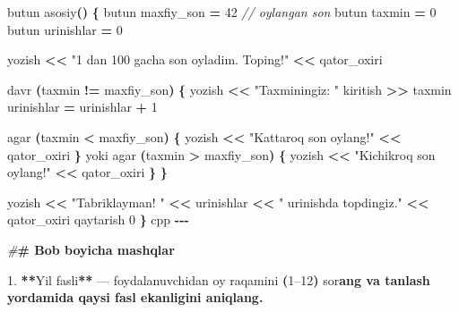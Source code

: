 \documentclass[a4paper,11pt,twoside,openright]{book}
\newenvironment{Shaded}{\begin{snugshade}}{\end{snugshade}}
\newcommand{\CharTok}[1]{\textcolor[rgb]{0.31,0.60,0.02}{#1}}
\newcommand{\CommentTok}[1]{\textcolor[rgb]{0.56,0.35,0.01}{\textit{#1}}}
\newcommand{\DecValTok}[1]{\textcolor[rgb]{0.00,0.00,0.81}{#1}}
\newcommand{\ErrorTok}[1]{\textcolor[rgb]{0.64,0.00,0.00}{\textbf{#1}}}
\newcommand{\FloatTok}[1]{\textcolor[rgb]{0.00,0.00,0.81}{#1}}
\newcommand{\NormalTok}[1]{#1}
\newcommand{\OperatorTok}[1]{\textcolor[rgb]{0.81,0.36,0.00}{\textbf{#1}}}
\newcommand{\PreprocessorTok}[1]{\textcolor[rgb]{0.56,0.35,0.01}{\textit{#1}}}
\newcommand{\StringTok}[1]{\textcolor[rgb]{0.31,0.60,0.02}{#1}}
\begin{document}
\begin{Shaded}
\begin{Highlighting}[]
\NormalTok{butun asosiy}\OperatorTok{()} \OperatorTok{\{}
\NormalTok{    butun maxfiy\_son }\OperatorTok{=} \DecValTok{42}   \CommentTok{// o\textquotesingle{}ylangan son}
\NormalTok{    butun taxmin }\OperatorTok{=} \DecValTok{0}
\NormalTok{    butun urinishlar }\OperatorTok{=} \DecValTok{0}

\NormalTok{    yozish }\OperatorTok{\textless{}\textless{}} \StringTok{"1 dan 100 gacha son o\textquotesingle{}yladim. Toping!"} \OperatorTok{\textless{}\textless{}}\NormalTok{ qator\_oxiri}

\NormalTok{    davr }\OperatorTok{(}\NormalTok{taxmin }\OperatorTok{!=}\NormalTok{ maxfiy\_son}\OperatorTok{)} \OperatorTok{\{}
\NormalTok{        yozish }\OperatorTok{\textless{}\textless{}} \StringTok{"Taxminingiz: "}
\NormalTok{        kiritish }\OperatorTok{\textgreater{}\textgreater{}}\NormalTok{ taxmin}
\NormalTok{        urinishlar }\OperatorTok{=}\NormalTok{ urinishlar }\OperatorTok{+} \DecValTok{1}

\NormalTok{        agar }\OperatorTok{(}\NormalTok{taxmin }\OperatorTok{\textless{}}\NormalTok{ maxfiy\_son}\OperatorTok{)} \OperatorTok{\{}
\NormalTok{            yozish }\OperatorTok{\textless{}\textless{}} \StringTok{"Kattaroq son o\textquotesingle{}ylang!"} \OperatorTok{\textless{}\textless{}}\NormalTok{ qator\_oxiri}
        \OperatorTok{\}}\NormalTok{ yoki agar }\OperatorTok{(}\NormalTok{taxmin }\OperatorTok{\textgreater{}}\NormalTok{ maxfiy\_son}\OperatorTok{)} \OperatorTok{\{}
\NormalTok{            yozish }\OperatorTok{\textless{}\textless{}} \StringTok{"Kichikroq son o\textquotesingle{}ylang!"} \OperatorTok{\textless{}\textless{}}\NormalTok{ qator\_oxiri}
        \OperatorTok{\}}
    \OperatorTok{\}}

\NormalTok{    yozish }\OperatorTok{\textless{}\textless{}} \StringTok{"Tabriklayman! "} \OperatorTok{\textless{}\textless{}}\NormalTok{ urinishlar }\OperatorTok{\textless{}\textless{}} \StringTok{" urinishda topdingiz."} \OperatorTok{\textless{}\textless{}}\NormalTok{ qator\_oxiri}
\NormalTok{    qaytarish }\DecValTok{0}
\OperatorTok{\}}
\ErrorTok{\textasciigrave{}\textasciigrave{}\textasciigrave{}}\NormalTok{cpp}
\OperatorTok{{-}{-}{-}}

\PreprocessorTok{\#}\ErrorTok{\# Bob bo\textquotesingle{}yicha mashqlar}

\FloatTok{1.} \OperatorTok{**}\NormalTok{Yil fasli}\OperatorTok{**}\NormalTok{ — foydalanuvchidan oy raqamini }\OperatorTok{(}\DecValTok{1}\NormalTok{–}\DecValTok{12}\OperatorTok{)}\NormalTok{ so}\CharTok{\textquotesingle{}r}\ErrorTok{ang va \textasciigrave{}tanlash\textasciigrave{} yordamida qaysi fasl ekanligini aniqlang.}


\end{Highlighting}
\end{Shaded}
\end{document}
